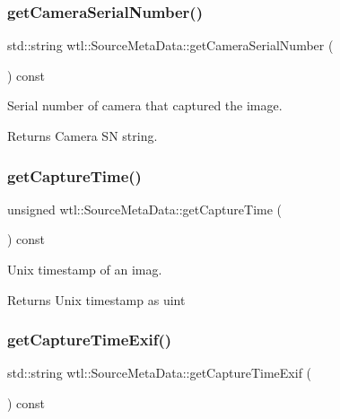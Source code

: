 \subsubsection{\texorpdfstring{get\+Camera\+Serial\+Number()}{getCameraSerialNumber()}}
{\footnotesize\ttfamily std\+::string wtl\+::\+Source\+Meta\+Data\+::get\+Camera\+Serial\+Number (\begin{DoxyParamCaption}{ }\end{DoxyParamCaption}) const}



Serial number of camera that captured the image. 

\begin{DoxyReturn}{Returns}
Camera SN string. 
\end{DoxyReturn}
\mbox{\label{classwtl_1_1_source_meta_data_ac0a710c790df3e6c20a2e5e0d09a72be}} 
\subsubsection{\texorpdfstring{get\+Capture\+Time()}{getCaptureTime()}}
{\footnotesize\ttfamily unsigned wtl\+::\+Source\+Meta\+Data\+::get\+Capture\+Time (\begin{DoxyParamCaption}{ }\end{DoxyParamCaption}) const}



Unix timestamp of an imag. 

\begin{DoxyReturn}{Returns}
Unix timestamp as uint 
\end{DoxyReturn}
\mbox{\label{classwtl_1_1_source_meta_data_a08906d8f70a1de5931be41a0e25d8564}} 
\subsubsection{\texorpdfstring{get\+Capture\+Time\+Exif()}{getCaptureTimeExif()}}
{\footnotesize\ttfamily std\+::string wtl\+::\+Source\+Meta\+Data\+::get\+Capture\+Time\+Exif (\begin{DoxyParamCaption}{ }\end{DoxyParamCaption}) const}




